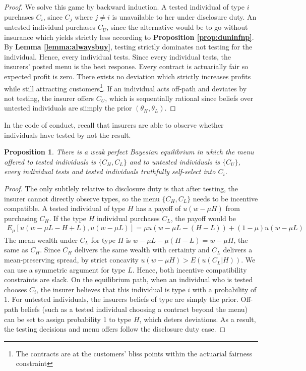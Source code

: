 \documentclass[natbib=false,preprint,12pt]{elsarticle}
\theoremstyle{plain}
\newtheorem{prop}[theorem]{Proposition}
\theoremstyle{definition}
\theoremstyle{plain}
\theoremstyle{TheoremNum}
\theoremstyle{CorollaryNum}
\theoremstyle{PropositionNum}
\theoremstyle{TheoremNum}
\begin{document}
\begin{proof}
    We solve this game by backward induction. A tested individual of type $i$ purchases $C_i$, since $C_j$ where $j \neq i$ is unavailable to her under disclosure duty. An untested individual purchases $C_U$, since the alternative would be to go without insurance which yields strictly less according to \textbf{Proposition \ref{prop:duninfnp}}. By \textbf{Lemma \ref{lemma:alwaysbuy}}, testing strictly dominates not testing for the individual. Hence, every individual tests. Since every individual tests, the insurers' posted menu is the best response. Every contract is actuarially fair so expected profit is zero. There exists no deviation which strictly increases profits while still attracting customers\footnote{The contracts are at the customers' bliss points within the actuarial fairness constraint}. If an individual acts off-path and deviates by not testing, the insurer offers $C_U$, which is sequentially rational since beliefs over untested individuals are siimply the prior $(\theta_H, \theta_L)$.
\end{proof}

In the code of conduct, recall that insurers are able to observe whether individuals have tested by not the result.

\begin{prop}\label{prop:cceqnoprinciple}
     There is a weak perfect Bayesian equilibrium in which the menu offered to tested individuals is $\{C_H, C_L\}$ and to untested individuals is $\{C_U\}$, every individual tests and tested individuals truthfully self-select into $C_i$.
\end{prop}

\begin{proof}
    The only subtlely relative to disclosure duty is that after testing, the insurer cannot directly observe types, so the menu $\{C_H, C_L\}$ needs to be incentive compatible. A tested individual of type $H$ has a payoff of $u(w-\mu H)$ from purchasing $C_H$. If the type $H$ individual purchases $C_L$, the payoff would be 
    \begin{align*}
        E_\mu \left[u(w-\mu L -H+L), u(w-\mu L)\right] = \mu u(w-\mu L - (H-L)) + (1-\mu)u(w-\mu L)
    \end{align*}
    The mean wealth under $C_L$ for type $H$ is $w-\mu L - \mu(H-L)=w-\mu H$, the same as $C_H$. Since $C_H$ delivers the same wealth with certainty and $C_L$ delivers a mean-preserving spread, by strict concavity $u(w-\mu H)> E(u(C_L|H))$. We can use a symmetric argument for type $L$. Hence, both incentive compatibility constraints are slack. On the equilibrium path, when an individual who is tested chooses $C_i$, the insurer believes that this individual is type $i$ with a probability of 1. For untested individuals, the insurers beliefs of type are simply the prior. Off-path beliefs (such as a tested individual choosing a contract beyond the menu) can be set to assign probability 1 to type $H$, which deters deviations. As a result, the testing decisions and menu offers follow the disclosure duty case.
\end{proof}
\end{document}
